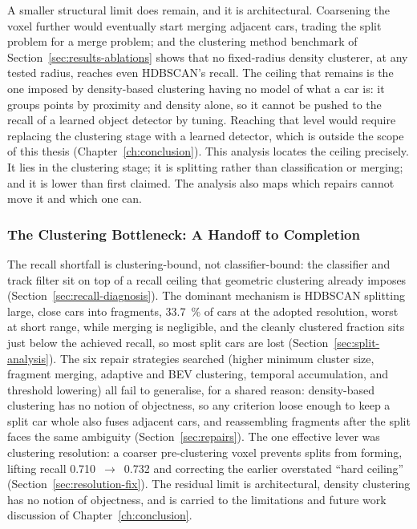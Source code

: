 A smaller structural limit does remain, and it is architectural. Coarsening the voxel
further would eventually start merging adjacent cars, trading the split problem for a
merge problem; and the clustering method benchmark of Section~\ref{sec:results-ablations}
shows that no fixed-radius density clusterer, at any tested radius, reaches even
HDBSCAN's recall. The ceiling that remains is the one imposed by density-based
clustering having no model of what a car is: it groups points by proximity and
density alone, so it cannot be pushed to the recall of a learned object detector by
tuning. Reaching that level would require replacing the clustering stage with a
learned detector, which is outside the scope of this thesis (Chapter~\ref{ch:conclusion}). This
analysis locates the ceiling precisely. It lies in the clustering stage; it is splitting
rather than classification or merging; and it is lower than first claimed. The analysis
also maps which repairs cannot move it and which one can.

\subsubsection{The Clustering Bottleneck: A Handoff to Completion}
\label{sec:recall-summary}

The recall shortfall is clustering-bound, not classifier-bound: the classifier and
track filter sit on top of a recall ceiling that geometric clustering already imposes
(Section~\ref{sec:recall-diagnosis}). The dominant mechanism is HDBSCAN splitting
large, close cars into fragments, \SI{33.7}{\percent} of cars at the adopted resolution, worst at
short range, while merging is negligible, and the cleanly clustered fraction sits
just below the achieved recall, so most split cars are lost
(Section~\ref{sec:split-analysis}). The six repair strategies searched (higher
minimum cluster size, fragment merging, adaptive and BEV clustering, temporal
accumulation, and threshold lowering) all fail to generalise, for a shared reason:
density-based clustering has no notion of objectness, so any criterion loose enough to
keep a split car whole also fuses adjacent cars, and reassembling fragments after the
split faces the same ambiguity (Section~\ref{sec:repairs}). The one effective lever was clustering
resolution: a coarser pre-clustering voxel prevents splits from forming, lifting
recall \num{0.710}~$\rightarrow$~\num{0.732} and correcting the earlier overstated
``hard ceiling'' (Section~\ref{sec:resolution-fix}). The residual limit is
architectural, density clustering has no notion of objectness, and is carried
to the limitations and future work discussion of Chapter~\ref{ch:conclusion}.



